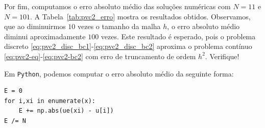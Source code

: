 \begin{sol}
Por fim, computamos o erro absoluto médio das soluções numéricas com $N=11$ e $N=101$. A Tabela~\ref{tab:pvc2_erro} mostra os resultados obtidos. Observamos, que ao diminuirmos $10$ vezes o tamanho da malha $h$, o erro absoluto médio diminui aproximadamente $100$ vezes. Este resultado é esperado, pois o problema discreto \eqref{eq:pvc2_disc_bc1}-\eqref{eq:pvc2_disc_bc2} aproxima o problema contínuo \eqref{eq:pvc2-eq}-\eqref{eq:pvc2-bc2} com erro de truncamento de ordem $h^2$. Verifique!

\ifispython
Em \verb+Python+, podemos computar o erro absoluto médio da seguinte forma:
\begin{verbatim}
E = 0
for i,xi in enumerate(x):
    E += np.abs(ue(xi) - u[i])
E /= N
\end{verbatim}
\fi

\end{sol}

